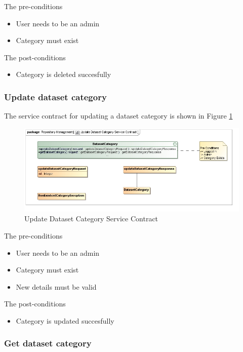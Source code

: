 The pre-conditions
\begin{itemize}
  \item User needs to be an admin
  \item Category must exist
\end{itemize}

The post-conditions
\begin{itemize}
  \item Category is deleted succesfully
\end{itemize}

\subsubsection {Update dataset category}

The service contract for updating a dataset category is shown in Figure \ref{fig:updateDatasetCatService}
\begin{figure}[H]
  \begin{center}
  \includegraphics[scale=0.6]{../Diagrams and Charts/Test Data/Update Dataset Category Service Contract.jpg}
  \caption{Update Dataset Category Service Contract}
  \label{fig:updateDatasetCatService}
  \end{center}
  
\end{figure}


The pre-conditions
\begin{itemize}
  \item User needs to be an admin
  \item Category must exist
  \item New details must be valid
\end{itemize}

The post-conditions
\begin{itemize}
  \item Category is updated succesfully
\end{itemize}
\subsubsection {Get dataset category}

